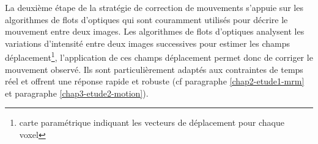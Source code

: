 
La deuxième étape de la stratégie de correction de mouvements s’appuie sur les algorithmes de flots d’optiques qui sont couramment utilisés pour décrire le mouvement entre deux images. Les algorithmes de flots d’optiques analysent les variations d’intensité entre deux images successives pour estimer les champs déplacement\footnote{carte paramétrique indiquant les vecteurs de déplacement pour chaque voxel}, l’application de ces champs déplacement permet donc de corriger le mouvement observé. Ils sont particulièrement adaptés aux contraintes de temps réel et offrent une réponse rapide et robuste (cf paragraphe \ref{chap2-etude1-mrm} et paragraphe \ref{chap3-etude2-motion}).\\
